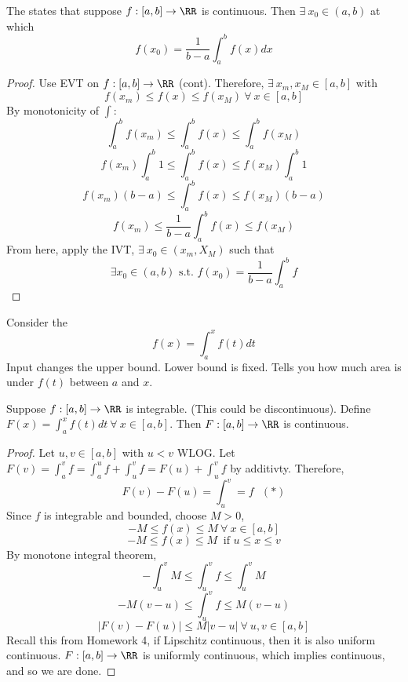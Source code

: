 \documentclass[12pt]{scrartcl}
\begin{document}
\begin{theorem}
  The  states that suppose $f: [a,b] \to \RR$ is continuous. 
  Then $\exists \ x_0 \in (a,b)$ at which 
  \[f(x_0) = \frac{1}{b-a}\int_a^b f(x) dx\]

  \begin{proof}
    Use EVT on $f: [a,b] \to \RR$ (cont). Therefore, $\exists \ x_m, x_M \in [a,b]$ with 
    \[f(x_m) \leq f(x) \leq f(x_M) \ \forall \ x \in [a,b]\]
    By monotonicity of $\int$: 
    \[\int_a^b f(x_m) \leq \int_a^b f(x) \leq \int_a^b f(x_M)\]
    \[f(x_m) \int_a^b 1 \leq \int_a^b f(x) \leq f(x_M) \int_a^b 1\]
    \[f(x_m) (b-a) \leq \int_a^b f(x) \leq f(x_M) (b-a)\]
    \[f(x_m) \leq \frac{1}{b-a}\int_a^b f(x) \leq f(x_M)\]
    From here, apply the IVT, $\exists \ x_0 \in (x_m, X_M)$ such that 
    \[\exists x_0 \in (a,b) \text{ s.t. } f(x_0) = \frac{1}{b-a}\int_a^b f\]
  \end{proof}
\end{theorem}

\begin{definition}
  Consider the 
  \[f(x) = \int_a^x f(t) dt\]
  Input changes the upper bound. Lower bound is fixed. Tells you how much area is under $f(t)$ between 
  $a$ and $x$.
\end{definition}

\begin{proposition}
  Suppose $f: [a,b] \to \RR$ is integrable. (This could be discontinuous). Define $F(x) = \int_a^x f(t) dt \ \forall \ x \in [a,b]$. 
  Then $F: [a,b] \to \RR$ is continuous. 

  \begin{proof}
    
    \hfill

    Let $u, v \in [a,b]$ with $u < v$ WLOG. Let $F(v) = \int_a^v f = \int_a^u f + \int_u^v f = F(u) + \int_u^v f$ by additivty.  Therefore, \[F(v) - F(u) = \int_u^v = f \ \ \ (*)\]
    Since $f$ is integrable and bounded, choose $M > 0$, 
    \[-M \leq f(x) \leq M \ \forall \ x \in [a,b]\]
    \[-M \leq f(x) \leq M \ \text{ if } u \leq x \leq v\]
    By monotone integral theorem, 
    \[-\int_u^v M \leq \int_u^v f \leq \int_u^v M\]
    \[-M(v-u) \leq \int_u^v f \leq M(v-u)\]
    \[|F(v) - F(u)| \leq M|v-u| \ \forall \ u, v \in [a,b]\]
    Recall this from Homework 4, if Lipschitz continuous, then it is also uniform continuous.
    $F: [a,b] \to \RR$ is uniformly continuous, which implies continuous, and so we are done.
  \end{proof}
\end{proposition}
\end{document}
